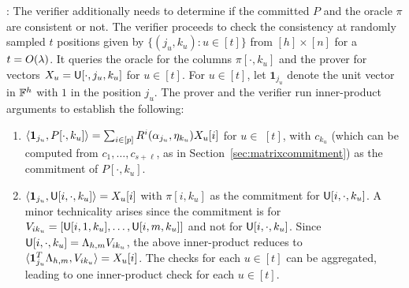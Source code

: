 : The verifier additionally
needs to determine if the committed $P$ and the oracle $\pi$ are consistent or not. The verifier proceeds to check the
consistency at randomly sampled $t$ positions given by $\{(j_u,k_u): u\in [t]\}$ from
$[h] \times [n]$ for a $t=O(\lambda)$. It queries the oracle for the columns $\pi[\cdot,k_u]$ and the prover for vectors $X_u = \mathsf{U}[\cdot,j_u,k_u]$ for
$u\in [t]$.  For $u\in [t]$, let %
$\bm{1}_{j_u}$ denote the unit vector in $\mathbb{F}^h$ with $1$ in the position
$j_u$. The prover and the verifier run inner-product arguments to establish the following:
\begin{enumerate}[{\rm 1.}]
\item $\langle \bm{1}_{j_u},P[\cdot,k_u]\rangle= \sum_{i \in [p]} R^i(\alpha_{j_u},\eta_{k_u}) X_u[i]$  for $u\in$
$[t]$, with $c_{k_u}$ (which can be computed from $c_1,\ldots,c_{s+\ell}$, as in Section~\ref{sec:matrixcommitment})  as the commitment of  $P[\cdot,k_u]$. %

\item $\langle \bm{1}_{j_u},\mathsf{U}[i,\cdot,k_u]\rangle = X_u[i]$ with $\pi[i,k_u]$ as the commitment for $\mathsf{U}[i,\cdot,k_u]$. A minor technicality arises since the commitment is 
for $V_{ik_u} = [\mathsf{U}[i,1,k_u], \ldots, \mathsf{U}[i,m,k_u]]$ and not for  $\mathsf{U}[i,\cdot,k_u]$. Since $\mathsf{U}[i,\cdot,k_u] = \Lambda_{h,m}V_{ik_u}$,  the above inner-product reduces to 
$ \langle \bm{1}^T_{j_u}\Lambda_{h,m}, V_{ik_u}\rangle = X_u[i]$.
The checks for each $u\in [t]$ can be aggregated, leading to one inner-product check for each $u\in
[t]$.
\end{enumerate}

